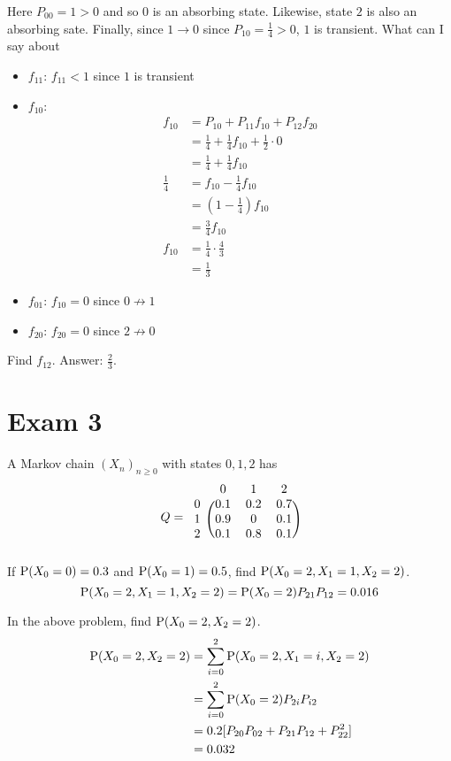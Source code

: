 \documentclass[12pt]{article}
\begin{document}
Here $P_{00} = 1 > 0$ and so $0$ is an absorbing state. Likewise, state $2$ is also an absorbing sate. Finally, since $1\to0$ since $P_{10} = \frac{1}{4} > 0$, $1$ is transient. What can I say about \begin{itemize} 
\item $f_{11}$: $f_{11} < 1$ since $1$ is transient 
\item $f_{10}$: $$ \begin{aligned} f_{10} &= P_{10} + P_{11}f_{10} + P_{12}f_{20} \\ &= \frac{1}{4} + \frac{1}{4}f_{10} + \frac{1}{2} \cdot 0 \\ &= \frac{1}{4} + \frac{1}{4}f_{10} \\ \frac{1}{4} &= f_{10} - \frac{1}{4}f_{10} \\ &= (1 - \frac{1}{4})f_{10} \\ &= \frac{3}{4}f_{10} \\ f_{10} &= \frac{1}{4} \cdot \frac{4}{3} \\ &= \frac{1}{3} \end{aligned} $$ 
\item $f_{01}$: $f_{10} = 0$ since $0 \not\to 1$
\item $f_{20}$: $f_{20} = 0$ since $2 \not\to 0$
\end{itemize}
Find $f_{12}$. Answer: $\frac{2}{3}$. 

\section{Exam 3} 
\begin{question} A Markov chain $(X_n)_{n\geq0}$ with states $0,1,2$ has $$Q  =  \begin{blockarray}{cccc}
&0&1&2 \\
\begin{block}{c(ccc)}
0 & 0.1 & 0.2 & 0.7  \\
1 & 0.9 & 0 & 0.1  \\ 
2 & 0.1 & 0.8 & 0.1  \\  \end{block} \end{blockarray} $$
If $\mathrm{P}( X_0 = 0 ) = 0.3$ and $\mathrm{P}( X_0 = 1 ) = 0.5$, find $\mathrm{P}( X_0 = 2, X_1 = 1, X_2 = 2 )$. 
$$ \mathrm{P}( X_0 = 2, X_1 = 1, X_2 =2 ) = \mathrm{P}( X_0=2 )P_{21}P_{12} = 0.016 $$ 
 \end{question} 
 
 \begin{question} In the above problem, find $\mathrm{P}( X_0 = 2, X_2 = 2 )$. 
 $$ \begin{aligned} \mathrm{P}( X_0=2,X_2=2 ) &= \sum_{i=0}^2 \mathrm{P}( X_0=2, X_1 = i,X_2=2 ) \\ &= \sum_{i=0}^2 \mathrm{P}( X_0=2 )P_{2i}P_{i2} \\ &= 0.2[P_{20}P_{02} + P_{21}P_{12} + P_{22}^2] \\ &= 0.032 \end{aligned} $$  
 \end{question} 
\end{document}
